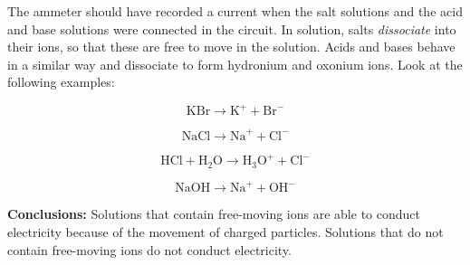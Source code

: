         \label{m38720*id339687}The ammeter should have recorded a current when the salt solutions and the acid and base solutions were connected in the circuit. In solution, salts \textsl{dissociate} into their ions, so that these are free to move in the solution. Acids and bases behave in a similar way and dissociate to form hydronium and oxonium ions. Look at the following examples:
        \label{m38720*id339701}\nopagebreak\noindent{}
          
    \begin{equation}
    \mathrm{KBr}\to {\mathrm{K}}^{+}+{\mathrm{Br}}^{-}\tag{17.9}
      \end{equation}
        \label{m38720*id339737}\nopagebreak\noindent{}
          
    \begin{equation}
    \mathrm{NaCl}\to {\mathrm{Na}}^{+}+{\mathrm{Cl}}^{-}\tag{17.10}
      \end{equation}
        \label{m38720*id339770}\nopagebreak\noindent{}
          
    \begin{equation}
    \mathrm{HCl}+{\mathrm{H}}_{2}\mathrm{O}\to {\mathrm{H}}_{3}{\mathrm{O}}^{+}+{\mathrm{Cl}}^{-}\tag{17.11}
      \end{equation}
        \label{m38720*id339831}\nopagebreak\noindent{}
          
    \begin{equation}
    \mathrm{NaOH}\to {\mathrm{Na}}^{+}+{\mathrm{OH}}^{-}\tag{17.12}
      \end{equation}
        \par 
        \label{m38720*id339864}\noindent{}\textbf{Conclusions:}
          \newline
Solutions that contain free-moving ions are able to conduct electricity because of the movement of charged particles. Solutions that do not contain free-moving ions do not conduct electricity.
 \par 
\label{m38720*notfhsst!!!underscore!!!id879}
	\par
\label{m38720**end}
